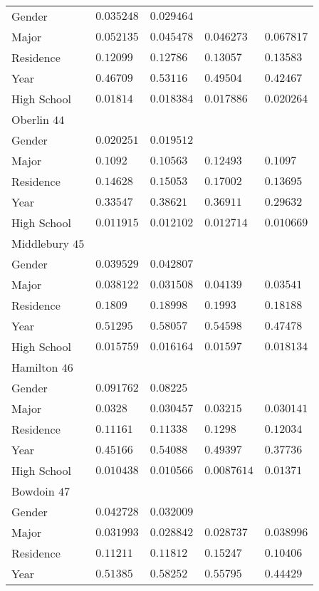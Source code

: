 \begin{center}
\begin{longtable}{|l|l|l|l|l|}
Gender & $0.035248$ & $0.029464$ & & \\
Major & $0.052135$ & $0.045478$ & $0.046273$ & $0.067817$ \\
Residence & $0.12099$ & $0.12786$ & $0.13057$ & $0.13583$ \\
Year & $0.46709$ & $0.53116$ & $0.49504$ & $0.42467$ \\
High School & $0.01814$ & $0.018384$ & $0.017886$ & $0.020264$ \\ \hline \hline
Oberlin $44$ & & &   \\ \hline
Gender & $0.020251$ & $0.019512$ & & \\
Major & $0.1092$ & $0.10563$ & $0.12493$ & $0.1097$ \\
Residence & $0.14628$ & $0.15053$ & $0.17002$ & $0.13695$ \\
Year & $0.33547$ & $0.38621$ & $0.36911$ & $0.29632$ \\
High School & $0.011915$ & $0.012102$ & $0.012714$ & $0.010669$ \\ \hline \hline
Middlebury $45$ & & &   \\ \hline
Gender & $0.039529$ & $0.042807$ & & \\
Major & $0.038122$ & $0.031508$ & $0.04139$ & $0.03541$ \\
Residence & $0.1809$ & $0.18998$ & $0.1993$ & $0.18188$ \\
Year & $0.51295$ & $0.58057$ & $0.54598$ & $0.47478$ \\
High School & $0.015759$ & $0.016164$ & $0.01597$ & $0.018134$ \\ \hline \hline
Hamilton $46$ & & &   \\ \hline
Gender & $0.091762$ & $0.08225$ & & \\
Major & $0.0328$ & $0.030457$ & $0.03215$ & $0.030141$ \\
Residence & $0.11161$ & $0.11338$ & $0.1298$ & $0.12034$ \\
Year & $0.45166$ & $0.54088$ & $0.49397$ & $0.37736$ \\
High School & $0.010438$ & $0.010566$ & $0.0087614$ & $0.01371$ \\ \hline \hline
Bowdoin $47$ & & &   \\ \hline
Gender & $0.042728$ & $0.032009$ & & \\
Major & $0.031993$ & $0.028842$ & $0.028737$ & $0.038996$ \\
Residence & $0.11211$ & $0.11812$ & $0.15247$ & $0.10406$ \\
Year & $0.51385$ & $0.58252$ & $0.55795$ & $0.44429$ \\

\end{longtable}
\end{center}

